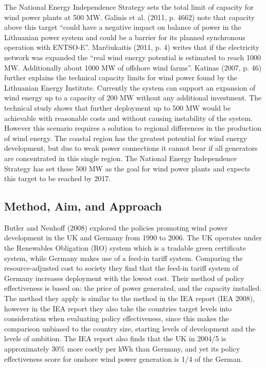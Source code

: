 \documentclass[a4paper, 12pt]{article}
\begin{document}
The National Energy Independence Strategy sets the total limit of capacity for wind power plants at 500 MW. Galinis et al. (2011, p. 4662) note that capacity above this target ``could have a negative impact on balance of power in the Lithuanian power system and could be a barrier for its planned synchronous operation with ENTSO-E''. Marčiukaitis (2011, p. 4) writes that if the electricity network was expanded the ``real wind energy potential is estimated to reach 1000 MW. Additionally about 1000 MW of offshore wind farms''. Katinas (2007, p. 46) further explains the technical capacity limits for wind power found by the Lithuanian Energy Institute. Currently the system can support an expansion of wind energy up to a capacity of 200 MW without any additional investment. The technical study shows that further deployment up to 500 MW would be achievable with reasonable costs and without causing instability of the system. However this scenario requires a solution to regional differences in the production of wind energy. The coastal region has the greatest potential for wind energy development, but due to weak power connections it cannot bear if all generators are concentrated in this single region. The National Energy Independence Strategy has set these 500 MW as the goal for wind power plants and expects this target to be reached by 2017. 

\subsection{Method, Aim, and Approach}
Butler and Neuhoff (2008) explored the policies promoting wind power development in the UK and Germany from 1990 to 2006. The UK operates under the Renewables Obligation (RO) system which is a tradable green certificate system, while Germany makes use of a feed-in tariff system. Comparing the resource-adjusted cost to society they find that the feed-in tariff system of Germany increases deployment with the lowest cost. Their method of policy effectiveness is based on: the price of power generated, and the capacity installed. The method they apply is similar to the method in the IEA report (IEA 2008), however in the IEA report they also take the countries target levels into consideration when evaluating policy effectiveness, since this makes the comparison unbiased to the country size, starting levels of development and the levels of ambition. The IEA report also finds that the UK in 2004/5 is approximately 30\% more costly per kWh than Germany, and yet its policy effectiveness score for onshore wind power generation is 1/4 of the German.
\end{document}
